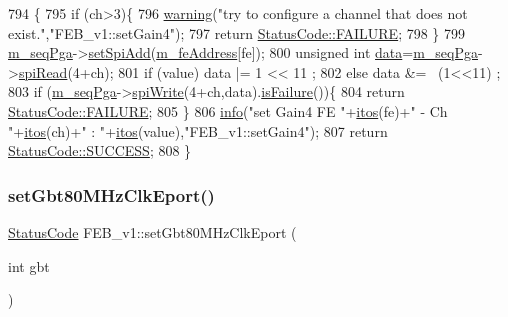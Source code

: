 \begin{DoxyCode}
794                                                        \{
795   \textcolor{keywordflow}{if} (ch>3)\{
796     \hyperlink{classObject_a65cd4fda577711660821fd2cd5a3b4c9}{warning}(\textcolor{stringliteral}{"try to configure a channel that does not exist."},\textcolor{stringliteral}{"FEB\_v1::setGain4"});
797     \textcolor{keywordflow}{return} \hyperlink{classStatusCode_a6f565cbeadc76d14c72f047e5e85eb4ba3da73d4c469762eb9d3c960368252b26}{StatusCode::FAILURE};
798   \}
799   \hyperlink{classFEB__v1_a6c7804ac86796f233a8393043adf2e77}{m\_seqPga}->\hyperlink{classSeqPGA_ac998ce3a6d9b5f2e88cc8393f8c1df53}{setSpiAdd}(\hyperlink{classFEB__v1_a4e1945c2d5b434125f375e9d0fc6d99f}{m\_feAddress}[fe]);
800   \textcolor{keywordtype}{unsigned} \textcolor{keywordtype}{int} \hyperlink{classFEB__v1_a6bca4320bd3bbbc32efc81097f33421a}{data}=\hyperlink{classFEB__v1_a6c7804ac86796f233a8393043adf2e77}{m\_seqPga}->\hyperlink{classSeqPGA_ab3d0e5e5d4014bc7a92588a76b8713d4}{spiRead}(4+ch);
801   \textcolor{keywordflow}{if} (value)  data |= 1 << 11 ;
802   \textcolor{keywordflow}{else}        data &= ~(1<<11) ;
803   \textcolor{keywordflow}{if} (\hyperlink{classFEB__v1_a6c7804ac86796f233a8393043adf2e77}{m\_seqPga}->\hyperlink{classSeqPGA_ad4421841ce4ce8b88ad13f63216f0743}{spiWrite}(4+ch,data).\hyperlink{classStatusCode_a5dd22dc6eb2c52fc4cabc58f6dea2eb7}{isFailure}())\{
804     \textcolor{keywordflow}{return} \hyperlink{classStatusCode_a6f565cbeadc76d14c72f047e5e85eb4ba3da73d4c469762eb9d3c960368252b26}{StatusCode::FAILURE};
805   \}
806   \hyperlink{classObject_a644fd329ea4cb85f54fa6846484b84a8}{info}(\textcolor{stringliteral}{"set Gain4 FE "}+\hyperlink{Tools_8h_af330027dbdafb9a30768b3613c553e60}{itos}(fe)+\textcolor{stringliteral}{" - Ch "}+\hyperlink{Tools_8h_af330027dbdafb9a30768b3613c553e60}{itos}(ch)+\textcolor{stringliteral}{" : "}+\hyperlink{Tools_8h_af330027dbdafb9a30768b3613c553e60}{itos}(value),\textcolor{stringliteral}{"FEB\_v1::setGain4"});
807   \textcolor{keywordflow}{return} \hyperlink{classStatusCode_a6f565cbeadc76d14c72f047e5e85eb4badd0da38d3ba0d922efd1f4619bc37ad8}{StatusCode::SUCCESS};
808 \}
\end{DoxyCode}
\mbox{\label{classFEB__v1_a6efa59ad9f80ae40aad2df0b925b0b14}} 
\subsubsection{\texorpdfstring{set\+Gbt80\+M\+Hz\+Clk\+Eport()}{setGbt80MHzClkEport()}}
{\footnotesize\ttfamily \hyperlink{classStatusCode}{Status\+Code} F\+E\+B\+\_\+v1\+::set\+Gbt80\+M\+Hz\+Clk\+Eport (\begin{DoxyParamCaption}\item[{int}]{gbt }\end{DoxyParamCaption})}



